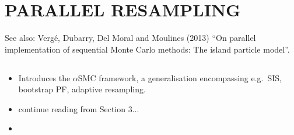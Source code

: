 \documentclass{article}
\begin{document}
%
\section*{PARALLEL RESAMPLING}
See also:
Verg\'e, Dubarry, Del Moral and Moulines (2013) ``On parallel implementation of sequential Monte Carlo methods: The island particle model''.

\subsection*{\cite{whiteley2016}}
\begin{itemize}
\item Introduces the $\alpha$SMC framework, a generalisation encompassing e.g.\ SIS, bootstrap PF, adaptive resampling.
\item continue reading from Section 3...
\item
\end{itemize}
\end{document}
